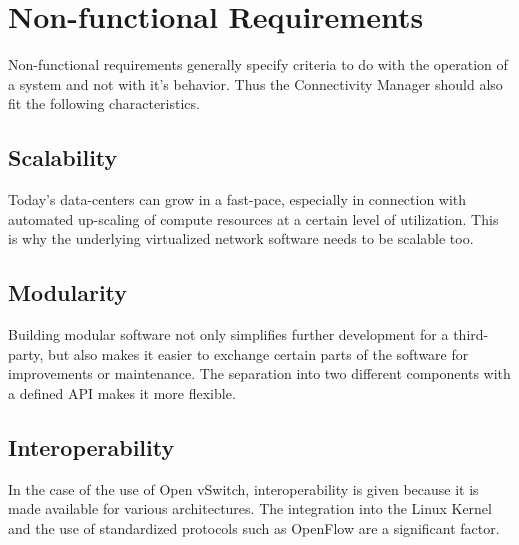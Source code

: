 \section{Non-functional Requirements}

Non-functional requirements generally specify criteria to do with the operation of a system and not with it's behavior. Thus the Connectivity Manager should also fit the following characteristics.

\subsection{Scalability}

Today's data-centers can grow in a fast-pace, especially in connection with automated up-scaling of compute resources at a certain level of utilization. This is why the underlying virtualized network software needs to be scalable too.

\subsection{Modularity}

Building modular software not only simplifies further development for a third-party, but also makes it easier to exchange certain parts of the software for improvements or maintenance. The separation into two different components with a defined API makes it more flexible.

\subsection{Interoperability}

In the case of the use of Open vSwitch, interoperability is given because it is made available for various architectures. The integration into the Linux Kernel and the use of standardized protocols such as OpenFlow are a significant factor.